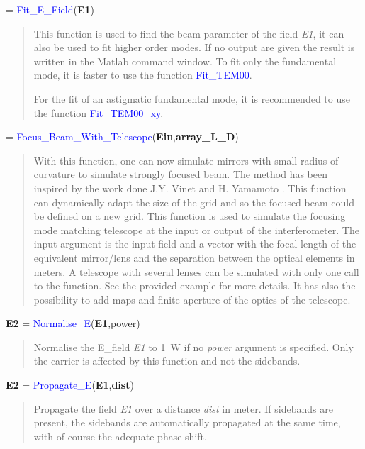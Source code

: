  = \textcolor{blue}{Fit\_E\_Field}(\textbf{E1})
\vspace*{-0.2cm}
\begin{quote}
This function is used to find the beam parameter of the field \textsl{E1}, it can also be used to fit higher order modes. If no output are given the result is written in the Matlab command window. To fit only the fundamental mode, it is faster to use the function \textcolor{blue}{Fit\_TEM00}.

For the fit of an astigmatic fundamental mode, it is recommended to use the function \textcolor{blue}{Fit\_TEM00\_xy}.
\end{quote}


 = \textcolor{blue}{Focus\_Beam\_With\_Telescope}(\textbf{Ein},\textbf{array\_L\_D})
\vspace*{-0.2cm}
\begin{quote}
With this function, one can now simulate mirrors with small radius of curvature to simulate strongly focused beam. The method has been inspired by the work done J.Y. Vinet \cite{Virgo_PB} and H. Yamamoto \cite{Hiro1}.
This function can dynamically adapt the size of the grid and so the focused beam could be defined on a new grid. This function is used to simulate the focusing mode matching telescope at the input or output of the interferometer.
The input argument is the input field and a vector with the focal length of the equivalent mirror/lens and the separation between the optical elements in meters. A telescope with several lenses can be simulated with only one call to the function.
See the provided example for more details.
It has also the possibility to add maps and finite aperture of the optics of the telescope.
\end{quote}

\noindent \textbf{E2} = \textcolor{blue}{Normalise\_E}(\textbf{E1},power)
\vspace*{-0.2cm}
\begin{quote}
Normalise the E\_field \textsl{E1} to 1~W if no \textsl{power} argument is specified. Only the carrier is affected by this function and not the sidebands.
\end{quote}

\noindent \textbf{E2} = \textcolor{blue}{Propagate\_E}(\textbf{E1},\textbf{dist})
\vspace*{-0.2cm}
\begin{quote}
Propagate the field \textsl{E1} over a distance \textsl{dist} in meter. If sidebands are present, the sidebands are automatically propagated at the same time, with of course the adequate phase shift.
\end{quote}

